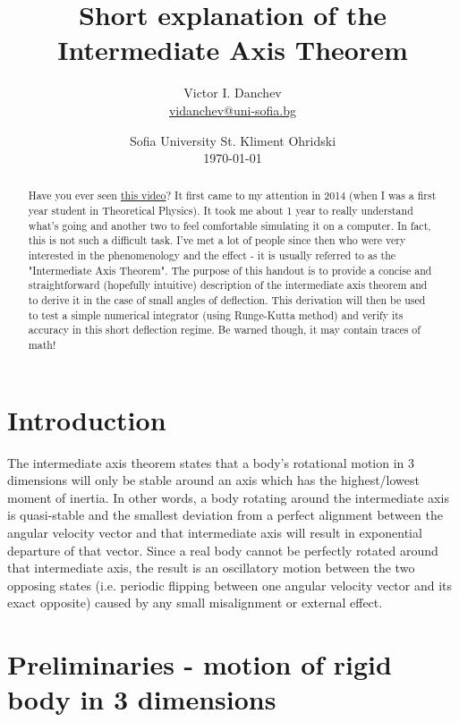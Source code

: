 \documentclass[a4paper]{article}
\title{Short explanation of the Intermediate Axis Theorem}
\author{Victor I.  Danchev \\ \href{vidanchev@uni-sofia.bg}{vidanchev@uni-sofia.bg}}
\date{
	Sofia University St.  Kliment Ohridski \\ 
	\today
}
\begin{document}
	\maketitle
	
	\begin{abstract}
	
	Have you ever seen \href{https://www.youtube.com/watch?v=1n-HMSCDYtM}{this video}?
	It first came to my attention in 2014 (when I was a first year student in Theoretical Physics).
	It took me about 1 year to really understand what's going and another two to feel comfortable simulating it on a computer.
	In fact,  this is not such a difficult task.
	I've met a lot of people since then who were very interested in the phenomenology and the effect - it is usually referred to as the "Intermediate Axis Theorem". 
	The purpose of this handout is to provide a concise and straightforward (hopefully intuitive) description of the intermediate axis theorem and to derive it in the case of small angles of deflection. 
	This derivation will then be used to test a simple numerical integrator (using Runge-Kutta method) and verify its accuracy in this short deflection regime.
	Be warned though, it may contain traces of math!
	\end{abstract}

	\tableofcontents

	\newpage
	
	\section{Introduction} \label{Intro}
	
	The intermediate axis theorem states that a body's rotational motion in 3 dimensions will only be stable around an axis which has the highest/lowest moment of inertia.
	In other words,  a body rotating around the intermediate axis is quasi-stable and the smallest deviation from a perfect alignment between the angular velocity vector and that intermediate axis will result in exponential departure of that vector.
	Since a real body cannot be perfectly rotated around that intermediate axis, the result is an oscillatory motion between the two opposing states (i.e. periodic flipping between one angular velocity vector and its exact opposite) caused by any small misalignment or external effect.	
	
	\section{Preliminaries - motion of rigid body in 3 dimensions}\label{rigid_body_dynamics}
\end{document}
